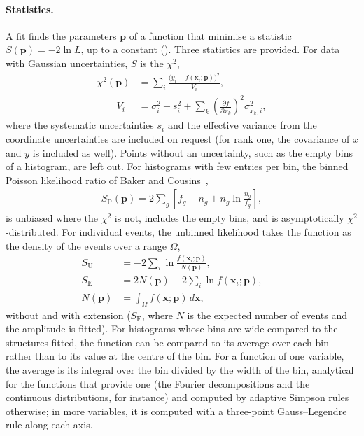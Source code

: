 \paragraph{Statistics.}
A fit finds the parameters $\mathbf{p}$ of a function that minimise a statistic $S(\mathbf{p}) = -2\ln L$, up to a
constant (). Three statistics are provided. For data with Gaussian uncertainties, $S$ is the
$\chi^2$,
\begin{align}
  \chi^2(\mathbf{p}) &= \sum_{i} \frac{\bigl(y_i - f(\mathbf{x}_i;\mathbf{p})\bigr)^2}{V_i},\\
  \qquad V_i& = \sigma_i^2 + s_i^2 + \sum_{k} \left(\frac{\partial f}{\partial x_k}\right)^{\!2} \sigma_{x_k,i}^2 ,
\end{align}
where the systematic uncertainties $s_i$ and the effective variance from the coordinate uncertainties are included
on request (for rank one, the covariance of $x$ and $y$ is included as well). Points without an uncertainty, such as
the empty bins of a histogram, are left out. For histograms with few entries per bin, the binned Poisson likelihood
ratio of Baker and Cousins~\cite{Baker:1983tu},
\begin{align}
  S_{\mathrm{P}}(\mathbf{p}) = 2 \sum_{g} \left[ f_g - n_g + n_g \ln\frac{n_g}{f_g} \right],
\end{align}
is unbiased where the $\chi^2$ is not, includes the empty bins, and is asymptotically $\chi^2$-distributed. For
individual events, the unbinned likelihood takes the function as the density of the events over a range $\Omega$,
\begin{align}
  S_{\mathrm{U}} &= -2\sum_{i} \ln\frac{f(\mathbf{x}_i;\mathbf{p})}{N(\mathbf{p})}, \qquad \\ 
  S_{\mathrm{E}} &= 2N(\mathbf{p}) - 2\sum_{i} \ln f(\mathbf{x}_i;\mathbf{p}), \qquad \\
  N(\mathbf{p}) &= \int_{\Omega} f(\mathbf{x};\mathbf{p})\, d\mathbf{x},
\end{align}
without and with extension ($S_{\mathrm{E}}$, where $N$ is the expected number of events and the amplitude is
fitted). For histograms whose bins are wide compared to the structures fitted, the function can be compared to its
average over each bin rather than to its value at the centre of the bin. For a function of one variable, the average
is its integral over the bin divided by the width of the bin, analytical for the functions that provide one (the
Fourier decompositions and the continuous distributions, for instance) and computed by adaptive Simpson rules
otherwise; in more variables, it is computed with a three-point Gauss--Legendre rule along each axis.

